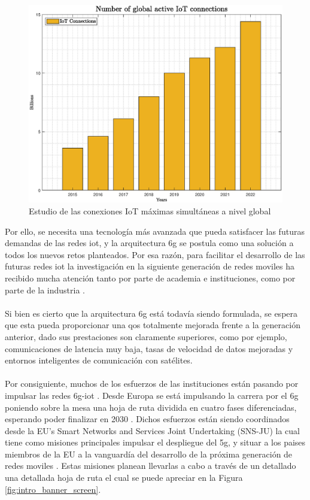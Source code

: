 \begin{figure}[ht]
    \centering
    \includegraphics[width=\textwidth]{archivos/img/intro/fig_iot.eps}
    \caption{Estudio de las conexiones IoT máximas simultáneas a nivel global \cite{figuraIoTDevices}}
    \label{fig:intro_fig_iot}
\end{figure}

Por ello, se necesita una tecnología más avanzada que pueda satisfacer las futuras demandas de las redes \gls{iot}, y la arquitectura \gls{6g} se postula como una solución a todos los nuevos retos planteados. Por esa razón, para facilitar el desarrollo de las futuras redes \gls{iot} la investigación en la siguiente generación de redes moviles ha recibido mucha atención tanto por parte de academia e instituciones, como por parte de la industria \cite{Nguyen2022}. \\
\\
Si bien es cierto que la arquitectura \gls{6g} está todavía siendo formulada, se espera que esta pueda proporcionar una \gls{qos} totalmente mejorada frente a la generación anterior, dado sus prestaciones son claramente superiores, como por ejemplo, comunicaciones de latencia muy baja, tasas de velocidad de datos mejoradas y entornos inteligentes de comunicación con satélites. \\
\\
Por consiguiente, muchos de los esfuerzos de las instituciones están pasando por impulsar las redes \gls{6g}-\gls{iot} \cite{liang2021transfer}. Desde Europa se está impulsando la carrera por el \gls{6g} poniendo sobre la mesa una hoja de ruta dividida en cuatro fases diferenciadas, esperando poder finalizar en 2030 \cite{eu6GFases}. Dichos esfuerzos están siendo coordinados desde la EU’s Smart Networks and Services Joint Undertaking (SNS-JU) la cual tiene como misiones principales impulsar el despliegue del \gls{5g}, y situar a los paises miembros de la EU a la vanguardía del desarrollo de la próxima generación de redes moviles \cite{eu6gSNS}. Estas misiones planean llevarlas a cabo a través de un detallado una detallada hoja de ruta el cual se puede apreciar en la Figura \ref{fig:intro_banner_screen}.

